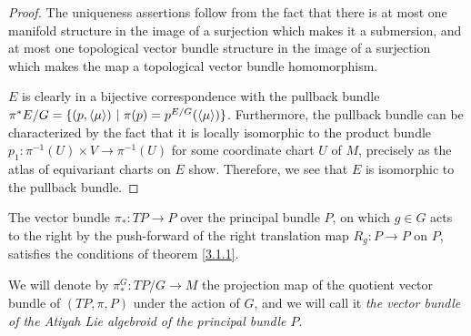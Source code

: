 \begin{proof}
The uniqueness assertions follow from the fact that there is at most one manifold structure in the image of a surjection which makes it a submersion, and at most one topological vector bundle structure in the image of a surjection which makes the map a topological vector bundle homomorphism.

$E$ is clearly in a bijective correspondence with the pullback bundle $\pi^*E/G = \{(p, \left\langle \mu \right\rangle) \ |\  \pi(p) = p^{E/G}(\left\langle \mu \right\rangle)\}$. Furthermore, the pullback bundle can be characterized by the fact that it is locally isomorphic to the product bundle $p_1: \pi^{-1}(U) \times V \to \pi^{-1}(U)$ for some coordinate chart $U$ of $M$, precisely as the atlas of equivariant charts on $E$ show. Therefore, we see that $E$ is isomorphic to the pullback bundle.
\end{proof}

\begin{theorem}\label{theoTPGexists}
The vector bundle $\pi_*:TP \to P$ over the principal bundle $P$, on which $g \in G$ acts to the right by the push-forward of the right translation map $R_g: P \to P$ on $P$, satisfies the conditions of theorem \ref{3.1.1}.
\end{theorem}

We will denote by $\pi_*^G:TP/G \to M$ the projection map of the quotient vector bundle of $(TP, \pi, P)$ under the action of $G$, and we will call it \emph{the vector bundle of the Atiyah Lie algebroid of the principal bundle $P$}.

